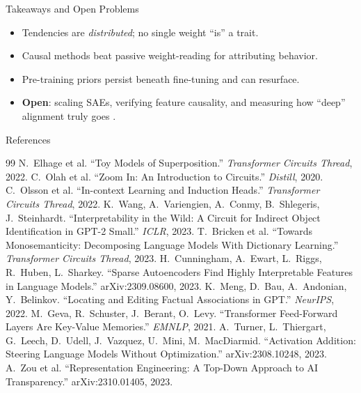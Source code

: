 \documentclass[aspectratio=169,11pt]{beamer}
\begin{document}
\begin{frame}{Takeaways and Open Problems}
  \begin{itemize}
    \item Tendencies are \emph{distributed}; no single weight ``is'' a trait.
    \item Causal methods beat passive weight-reading for attributing behavior.
    \item Pre-training priors persist beneath fine-tuning and can resurface.
    \item \textbf{Open}: scaling SAEs, verifying feature causality, and measuring how
      ``deep'' alignment truly goes \citep{qi2024safetyshallow,bricken2023monosemanticity}.
  \end{itemize}
\end{frame}

\begin{frame}[allowframebreaks]{References}
  \footnotesize
  \begin{thebibliography}{99}
     N.~Elhage et al. ``Toy Models of Superposition.'' \emph{Transformer Circuits Thread}, 2022.
     C.~Olah et al. ``Zoom In: An Introduction to Circuits.'' \emph{Distill}, 2020.
     C.~Olsson et al. ``In-context Learning and Induction Heads.'' \emph{Transformer Circuits Thread}, 2022.
     K.~Wang, A.~Variengien, A.~Conmy, B.~Shlegeris, J.~Steinhardt. ``Interpretability in the Wild: A Circuit for Indirect Object Identification in GPT-2 Small.'' \emph{ICLR}, 2023.
     T.~Bricken et al. ``Towards Monosemanticity: Decomposing Language Models With Dictionary Learning.'' \emph{Transformer Circuits Thread}, 2023.
     H.~Cunningham, A.~Ewart, L.~Riggs, R.~Huben, L.~Sharkey. ``Sparse Autoencoders Find Highly Interpretable Features in Language Models.'' arXiv:2309.08600, 2023.
     K.~Meng, D.~Bau, A.~Andonian, Y.~Belinkov. ``Locating and Editing Factual Associations in GPT.'' \emph{NeurIPS}, 2022.
     M.~Geva, R.~Schuster, J.~Berant, O.~Levy. ``Transformer Feed-Forward Layers Are Key-Value Memories.'' \emph{EMNLP}, 2021.
     A.~Turner, L.~Thiergart, G.~Leech, D.~Udell, J.~Vazquez, U.~Mini, M.~MacDiarmid. ``Activation Addition: Steering Language Models Without Optimization.'' arXiv:2308.10248, 2023.
     A.~Zou et al. ``Representation Engineering: A Top-Down Approach to AI Transparency.'' arXiv:2310.01405, 2023.

\end{thebibliography}
\end{frame}
\end{document}
